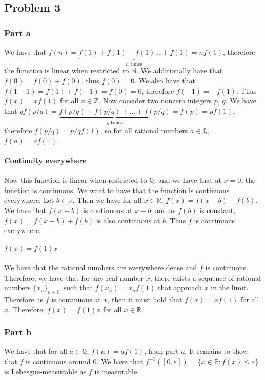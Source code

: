 \documentclass{article}
\theoremstyle{definition}
\numberwithin{theorem}{section}
\numberwithin{equation}{section}
\begin{document}
\subsection{Problem 3}
\subsubsection{Part a}
We have that $f(n) = \underbrace{f(1) + f(1) + f(1) ... + f(1)}_{n \text{ times}} = n f(1) $, therefore the function is linear when restricted to $\mathbb{N}$. We additionally have that $f(0) = f(0) + f(0)$, thus $f(0) = 0$. We also have that $f(1 - 1) = f(1) + f(-1) = f(0) = 0$, therefore $f(-1) = - f(1)$. Thus $f(x) = x f(1)$ for all $x \in \mathbb{Z}$. Now consider two nonzero integers $p$, $q$. We have that $q f(p/q) = \underbrace{f(p/q) + f(p/q) + ... + f(p/q)}_{q \text{ times}} = f(p) = p f(1)$, therefore $f(p/q) = p/q f(1)$, so for all rational numbers $a \in \mathbb{Q}$, $f(a) = a f(1)$. 
\paragraph{Continuity everywhere}
Now this function is linear when restricted to $\mathbb{Q}$, and we have that at $x = 0$, the function is continuous. We want to have that the function is continuous everywhere. Let $b \in \mathbb{R}$. Then we have for all $x \in \mathbb{R}$, $f(x) = f(x - b) + f(b)$. We have that $f(x - b)$ is continuous at $x - b$, and as $f(b)$ is constant, $f(x) = f(x - b) + f(b)$ is also continuous at $b$. Thus $f$ is continuous everywhere.
\paragraph{$f(x) = f(1) x$}
We have that the rational numbers are everywhere dense and $f$ is continuous. Therefore, we have that for any real number $x$, there exists a sequence of rational numbers $\lbrace x_n \rbrace_{n \in \mathbb{N}}$ such that $f(x_n) = x_n f(1)$ that approach $x$ in the limit. Therefore as $f$ is continuous at $x$, then it must hold that $f(x) = x f(1)$ for all $x$. Therefore, $f(x) = f(1) x$ for all $x \in \mathbb{R}$. 

\subsubsection{Part b}
We have that for all $a \in \mathbb{Q}$, $f(a) = a f(1)$, from part $a$. It remains to show that $f$ is continuous around $0$. We have that $f^{-1}([0, \varepsilon]) = \lbrace x \in \mathbb{R}: f(x) \leq \varepsilon \rbrace$ is Lebesgue-measurable as $f$ is measurable.
\end{document}
